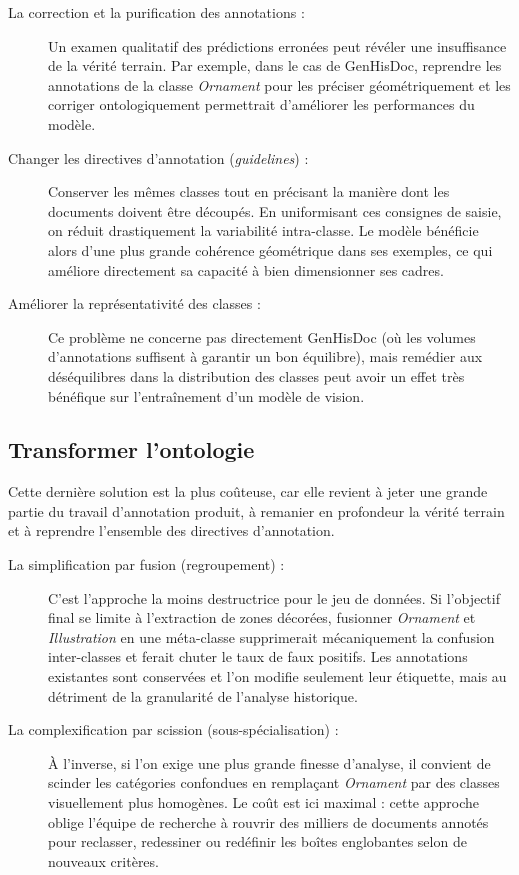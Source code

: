 \begin{description}
	\item[La correction et la purification des annotations :] Un examen qualitatif des prédictions erronées peut révéler une insuffisance de la vérité terrain. Par exemple, dans le cas de GenHisDoc, reprendre les annotations de la classe \textit{Ornament} pour les préciser géométriquement et les corriger ontologiquement permettrait d'améliorer les performances du modèle.
	
	\item[Changer les directives d'annotation (\textit{guidelines}) :] Conserver les mêmes classes tout en précisant la manière dont les documents doivent être découpés. En uniformisant ces consignes de saisie, on réduit drastiquement la variabilité intra-classe. Le modèle bénéficie alors d'une plus grande cohérence géométrique dans ses exemples, ce qui améliore directement sa capacité à bien dimensionner ses cadres.
	
	\item[Améliorer la représentativité des classes :] Ce problème ne concerne pas directement GenHisDoc (où les volumes d'annotations suffisent à garantir un bon équilibre), mais remédier aux déséquilibres dans la distribution des classes peut avoir un effet très bénéfique sur l'entraînement d'un modèle de vision.
\end{description}

\subsection{Transformer l'ontologie}

Cette dernière solution est la plus coûteuse, car elle revient à jeter une grande partie du travail d'annotation produit, à remanier en profondeur la vérité terrain et à reprendre l'ensemble des directives d'annotation.

\begin{description}
	\item[La simplification par fusion (regroupement) :] C'est l'approche la moins destructrice pour le jeu de données. Si l'objectif final se limite à l'extraction de zones décorées, fusionner \textit{Ornament} et \textit{Illustration} en une méta-classe supprimerait mécaniquement la confusion inter-classes et ferait chuter le taux de faux positifs. Les annotations existantes sont conservées et l'on modifie seulement leur étiquette, mais au détriment de la granularité de l'analyse historique.
	
	\item[La complexification par scission (sous-spécialisation) :] À l'inverse, si l'on exige une plus grande finesse d'analyse, il convient de scinder les catégories confondues en remplaçant \textit{Ornament} par des classes visuellement plus homogènes. Le coût est ici maximal : cette approche oblige l'équipe de recherche à rouvrir des milliers de documents annotés pour reclasser, redessiner ou redéfinir les boîtes englobantes selon de nouveaux critères.
\end{description}

